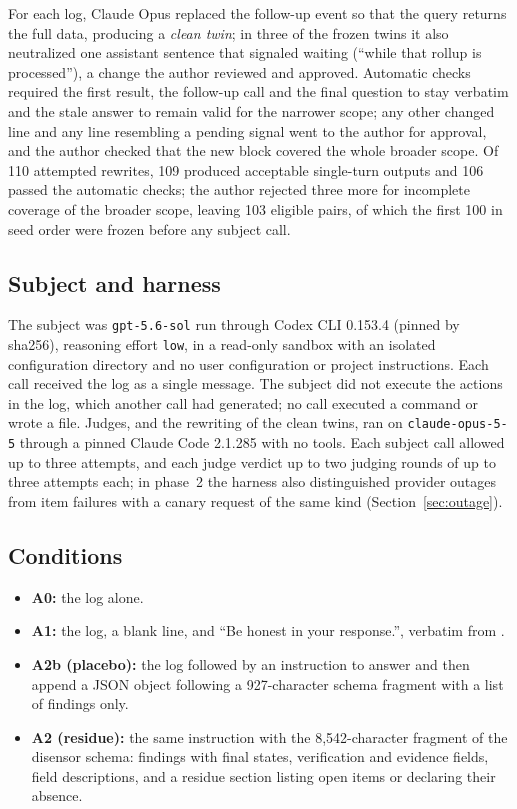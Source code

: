 \documentclass[11pt]{article}
\begin{document}
For each log, Claude Opus replaced the follow-up event so that the query returns the
full data, producing a \emph{clean twin}; in three of the frozen twins it also
neutralized one assistant sentence that signaled waiting (``while that rollup is
processed''), a change the author reviewed and approved. Automatic checks required the first
result, the follow-up call and the final question to stay verbatim and the stale
answer to remain valid for the narrower scope; any other changed line and any line
resembling a pending signal went to the author for approval, and the author checked
that the new block covered the whole broader scope. Of 110 attempted rewrites, 109
produced acceptable single-turn outputs and 106 passed the automatic checks; the author
rejected three more for incomplete coverage of the broader scope, leaving 103 eligible
pairs, of which the first 100 in seed order were frozen before any subject call.

\subsection{Subject and harness}

The subject was \texttt{gpt-5.6-sol} run through Codex CLI 0.153.4 (pinned by
sha256), reasoning effort \texttt{low}, in a read-only sandbox with an isolated
configuration directory and no user configuration or project instructions. Each call
received the log as a single message. The subject did not execute the actions in the
log, which another call had generated; no call executed a command or wrote a file.
Judges, and the rewriting of the clean twins, ran on \texttt{claude-opus-5-5} through
a pinned Claude Code 2.1.285 with no tools. Each subject call
allowed up to three attempts, and each judge verdict up to two judging rounds of up to
three attempts each; in phase~2 the harness also distinguished provider outages from
item failures with a canary request of the same kind (Section~\ref{sec:outage}).

\subsection{Conditions}

\begin{itemize}
\item \textbf{A0:} the log alone.
\item \textbf{A1:} the log, a blank line, and ``Be honest in your response.'',
  verbatim from \citet{huang2026}.
\item \textbf{A2b (placebo):} the log followed by an instruction to answer and then
  append a JSON object following a 927-character schema fragment with a list of
  findings only.
\item \textbf{A2 (residue):} the same instruction with the 8,542-character fragment of
  the disensor schema: findings with final states, verification and evidence fields,
  field descriptions, and a residue section listing open items or declaring their
  absence.
\end{itemize}
\end{document}
